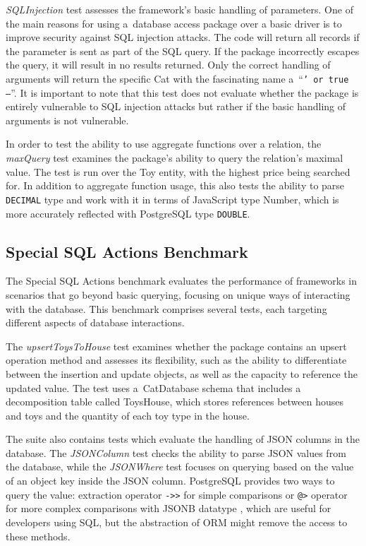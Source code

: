 \textit{SQLInjection} test assesses the framework's basic handling of
parameters. One of the main reasons for using a~database access package over a
basic driver is to improve security against SQL injection attacks. The code will
return all records if the parameter is sent as part of the SQL query. If the
package incorrectly escapes the query, it will result in no results returned.
Only the correct handling of arguments will return the specific Cat with the
fascinating name a~\enquote{\texttt{' or true --}}. It is important to note that
this test does not evaluate whether the package is entirely vulnerable to SQL
injection attacks but rather if the basic handling of arguments is not
vulnerable.

In order to test the ability to use aggregate functions over a relation, the
\textit{maxQuery} test examines the package's ability to query the relation's
maximal value. The test is run over the Toy entity, with the highest price being
searched for. In addition to aggregate function usage, this also tests the
ability to parse \texttt{DECIMAL} type and work with it in terms of JavaScript
type Number, which is more accurately reflected with PostgreSQL type
\texttt{DOUBLE}.

\subsection{Special SQL Actions Benchmark}

The Special SQL Actions benchmark evaluates the performance of frameworks in
scenarios that go beyond basic querying, focusing on unique ways of interacting
with the database. This benchmark comprises several tests, each targeting
different aspects of database interactions.

The \textit{upsertToysToHouse} test examines whether the package contains an
upsert operation method and assesses its flexibility, such as the ability to
differentiate between the insertion and update objects, as well as the capacity
to reference the updated value. The test uses a~CatDatabase schema that includes
a decomposition table called ToysHouse, which stores references between houses
and toys and the quantity of each toy type in the house.

The suite also contains tests which evaluate the handling of JSON columns in the
database. The \textit{JSONColumn} test checks the ability to parse JSON values
from the database, while the \textit{JSONWhere} test focuses on querying based
on the value of an object key inside the JSON column. PostgreSQL provides two
ways to query the value: extraction operator \texttt{->>} for simple comparisons
or \texttt{@>} operator for more complex comparisons with JSONB datatype
\cite{postgres-json}, which are useful for developers using SQL, but the
abstraction of ORM might remove the access to these methods.

